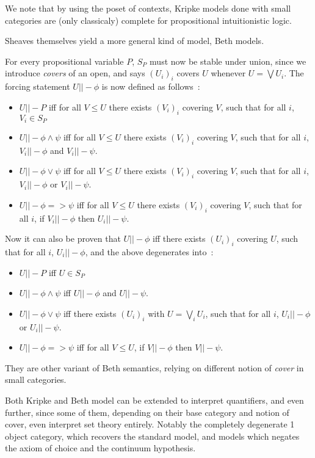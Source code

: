 \documentclass[11pt]{article}
\newcommand{\0}{\mathbf{0}}
\newcommand{\1}{\mathbf{1}}
\begin{document}
We note that by using the poset of contexts, Kripke models done with small categories are (only classicaly) complete for propositional intuitionistic logic.

Sheaves themselves yield a more general kind of model, Beth models.

For every propositional variable $P$, $S_P$ must now be stable under union, since we introduce \emph{covers} of an open, and says $(U_i)_i$ covers $U$ whenever $U = \bigvee U_i$. The forcing statement $U ||- \phi$ is now defined as follows~:
\begin{itemize}
    \item $U ||- P$ iff for all $V \leq U$ there exists $(V_i)_i$ covering $V$, such that for all $i$, $V_i \in S_P$
    \item $U ||- \phi \wedge \psi$ iff for all $V \leq U$ there exists $(V_i)_i$ covering $V$, such that for all $i$, $V_i ||- \phi$ and $V_i ||- \psi $.
    \item $U ||- \phi \vee \psi $ iff for all $V \leq U$ there exists $(V_i)_i$ covering $V$, such that for all $i$, $V_i ||- \phi$ or $V_i ||- \psi $.
    \item $U ||- \phi => \psi $ iff for all $V \leq U$ there exists $(V_i)_i$ covering $V$, such that for all $i$, if $V_i ||- \phi$ then $U_i ||- \psi $.
\end{itemize}
Now it can also be proven that $U ||- \phi$ iff there exists $(U_i)_i$ covering $U$, such that for all $i$, $U_i||- \phi$, and the above degenerates into~:
\begin{itemize}
    \item $U ||- P$ iff $U \in S_P$
    \item $U ||- \phi \wedge \psi$ iff $U ||- \phi$ and $U ||- \psi $.
    \item $U ||- \phi \vee \psi $ iff there exists $(U_i)_i$ with $U = \bigvee_i U_i$, such that for all $i$, $U_i ||- \phi$ or $U_i ||- \psi $.
    \item $U ||- \phi => \psi $ iff for all $V \leq U$, if $V ||- \phi$ then $V ||- \psi $.
\end{itemize}

They are other variant of Beth semantics, relying on different notion of \emph{cover} in small categories.

Both Kripke and Beth model can be extended to interpret quantifiers, and even further, since some of them, depending on their base category and notion of cover, even interpret set theory entirely. Notably the completely degenerate 1 object category, which recovers the standard model, and models which negates the axiom of choice and the continuum hypothesis.
\end{document}
